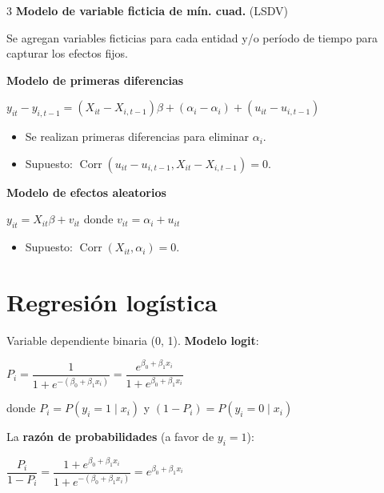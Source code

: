 \documentclass[10pt, a4paper, landscape]{article}
\DeclareMathOperator{\Corr}{Corr}
\begin{document}
\begin{multicols}{3}
\textbf{Modelo de variable ficticia de mín. cuad.} (LSDV)

Se agregan variables ficticias para cada entidad y/o período de tiempo para capturar los efectos fijos.

\textbf{Modelo de primeras diferencias}

\begin{center}
	\( y_{it} - y_{i, t - 1} = (X_{it} - X_{i, t - 1}) \beta + (\alpha_{i} - \alpha_{i}) + (u_{it} - u_{i, t - 1}) \)
\end{center}

\begin{itemize}[leftmargin=*]
	\item Se realizan primeras diferencias para eliminar \( \alpha_{i} \).
	\item Supuesto: \( \Corr(u_{it} - u_{i, t - 1}, X_{it} - X_{i, t - 1}) = 0 \).
\end{itemize}

\textbf{Modelo de efectos aleatorios}

\begin{center}
	\( y_{it} = X_{it} \beta + v_{it} \) donde \( v_{it} = \alpha_{i} + u_{it} \)
\end{center}

\begin{itemize}[leftmargin=*]
	\item Supuesto: \( \Corr(X_{it}, \alpha_i) = 0 \).
\end{itemize}

\section*{Regresión logística}

Variable dependiente binaria (0, 1). \textbf{Modelo logit}:

\begin{center}
	\( P_{i} = \dfrac{1}{1 + e^{-(\beta_{0} + \beta_{1} x_{i})}}= \dfrac{e^{\beta_{0} + \beta_{1} x_{i}}}{1 + e^{\beta_{0} + \beta_{1} x_{i}}} \)
\end{center}

donde \( P_{i} = P(y_{i} = 1 \mid x_{i}) \) y \( (1 - P_{i}) = P(y_{i} = 0 \mid x_{i}) \)

La \textbf{razón de probabilidades} (a favor de \( y_{i} = 1 \)):

\begin{center}
	\( \dfrac{P_{i}}{1 - P_{i}} = \dfrac{1 + e^{\beta_{0} + \beta_{1} x_{i}}}{1 + e^{-(\beta_{0} + \beta_{1} x_{i})}} = e^{\beta_{0} + \beta_{1} x_{i}} \)
\end{center}


\end{multicols}
\end{document}
